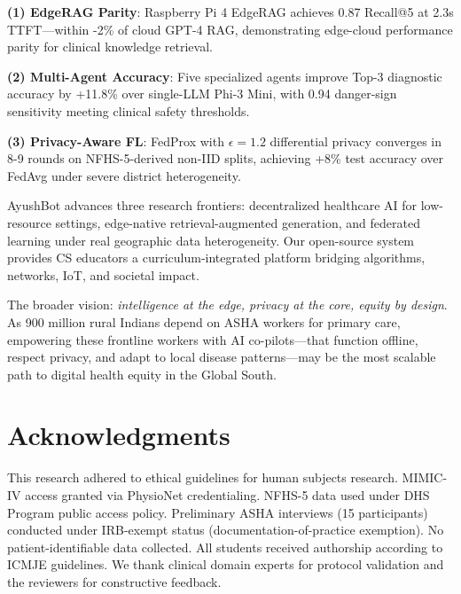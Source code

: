 \documentclass[conference,compsoc]{IEEEtran}
\begin{document}
\textbf{(1) EdgeRAG Parity}: Raspberry Pi 4 EdgeRAG achieves 0.87 Recall@5 at 2.3s TTFT—within -2\% of cloud GPT-4 RAG, demonstrating edge-cloud performance parity for clinical knowledge retrieval.

\textbf{(2) Multi-Agent Accuracy}: Five specialized agents improve Top-3 diagnostic accuracy by +11.8\% over single-LLM Phi-3 Mini, with 0.94 danger-sign sensitivity meeting clinical safety thresholds.

\textbf{(3) Privacy-Aware FL}: FedProx with \(\epsilon=1.2\) differential privacy converges in 8-9 rounds on NFHS-5-derived non-IID splits, achieving +8\% test accuracy over FedAvg under severe district heterogeneity.

AyushBot advances three research frontiers: decentralized healthcare AI for low-resource settings, edge-native retrieval-augmented generation, and federated learning under real geographic data heterogeneity. Our open-source system provides CS educators a curriculum-integrated platform bridging algorithms, networks, IoT, and societal impact.

The broader vision: \textit{intelligence at the edge, privacy at the core, equity by design}. As 900 million rural Indians depend on ASHA workers for primary care, empowering these frontline workers with AI co-pilots—that function offline, respect privacy, and adapt to local disease patterns—may be the most scalable path to digital health equity in the Global South.

\section*{Acknowledgments}

This research adhered to ethical guidelines for human subjects research. MIMIC-IV access granted via PhysioNet credentialing. NFHS-5 data used under DHS Program public access policy. Preliminary ASHA interviews (15 participants) conducted under IRB-exempt status (documentation-of-practice exemption). No patient-identifiable data collected. All students received authorship according to ICMJE guidelines. We thank clinical domain experts for protocol validation and the reviewers for constructive feedback.
\end{document}
